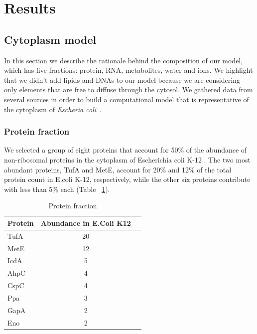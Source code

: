 \documentclass[journal=jacsat,manuscript=article]{achemso}
\begin{document}
\section*{Results}




\subsection{Cytoplasm model}
In this section we describe the rationale behind the composition of our model, which has five fractions: protein, RNA, metabolites, water and ions. We highlight that we didn't add lipids and DNAs to our model because we are considering only elements that are free to diffuse through the cytosol. We gathered data from several sources in order to build a computational model that is representative of the cytoplasm of {\em Escheria coli}~\cite{Dong1996,Bennett2009,Link1997,Mcguffee2010}.




\subsubsection{Protein fraction}
We selected a group of eight proteins that account for 50\% of the abundance of non-ribosomal proteins in the cytoplasm of Escherichia coli K-12 \cite{ref_prot_abundance}. The two most abundant proteins, TufA and MetE, account for 20\% and 12\% of the total protein count in E.coli K-12, respectively, while the other six proteins contribute with less than 5\% each (Table ~\ref{tbl:protein_fraction}).



\begin{table}
\centering
\begin{tabular}{lcc}
\hline
Protein & Abundance in E.Coli K12 \\ 
\hline
TufA	 & 20 \\
MetE	 & 12 \\
IcdA	 & 5 \\
AhpC	 & 4 \\
CspC	 & 4 \\
Ppa & 3 \\
GapA	 & 2 \\
Eno & 2 \\
\hline
\end{tabular}
\caption{Protein fraction}
\label{tbl:protein_fraction}
\end{table}
\end{document}
